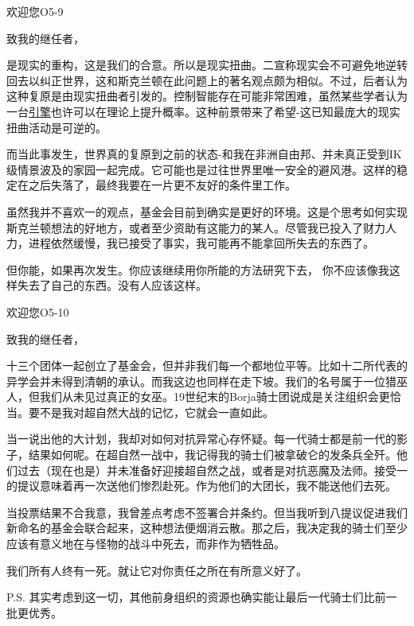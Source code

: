 \begin{scpbox}

欢迎您O5-9

致我的继任者，

是现实的重构，这是我们的合意。所以是现实扭曲。二宣称现实会不可避免地逆转回去以纠正世界，这和斯克兰顿在此问题上的著名观点颇为相似。不过，后者认为这种复原是由现实扭曲者引发的。控制智能存在可能非常困难，虽然某些学者认为一台\hyperref[chap:GOI-grant.request.for.the.manufacture.of.devices.to.regulate]{引擎}也许可以在理论上提升概率。这种前景带来了希望-这已知最庞大的现实扭曲活动是可逆的。

而当此事发生，世界真的复原到之前的状态-和我在非洲自由邦、并未真正受到IK级情景波及的家园一起完成。它可能也是过往世界里唯一安全的避风港。这样的稳定在之后失落了，最终我要在一片更不友好的条件里工作。

虽然我并不喜欢一的观点，基金会目前到确实是更好的环境。这是个思考如何实现斯克兰顿想法的好地方，或者至少资助有这能力的某人。尽管我已投入了财力人力，进程依然缓慢，我已接受了事实，我可能再不能拿回所失去的东西了。

但你能，如果再次发生。你应该继续用你所能的方法研究下去， 你不应该像我这样失去了自己的东西。没有人应该这样。

\end{scpbox}

\begin{scpbox}

欢迎您O5-10

致我的继任者，

十三个团体一起创立了基金会，但并非我们每一个都地位平等。比如十二所代表的异学会并未得到清朝的承认。而我这边也同样在走下坡。我们的名号属于一位猎巫人，但我们从未见过真正的女巫。19世纪末的Borja骑士团说成是关注组织会更恰当。要不是我对超自然大战的记忆，它就会一直如此。

当一说出他的大计划，我却对如何对抗异常心存怀疑。每一代骑士都是前一代的影子，结果如何呢。在超自然一战中，我记得我的骑士们被拿破仑的发条兵全歼。他们过去（现在也是）并未准备好迎接超自然之战，或者是对抗恶魔及法师。接受一的提议意味着再一次送他们惨烈赴死。作为他们的大团长，我不能送他们去死。

当投票结果不合我意，我曾差点考虑不签署合并条约。但当我听到八提议促进我们新命名的基金会联合起来，这种想法便烟消云散。那之后，我决定我的骑士们至少应该有意义地在与怪物的战斗中死去，而非作为牺牲品。

我们所有人终有一死。就让它对你责任之所在有所意义好了。

P.S. 其实考虑到这一切，其他前身组织的资源也确实能让最后一代骑士们比前一批更优秀。

\end{scpbox}

